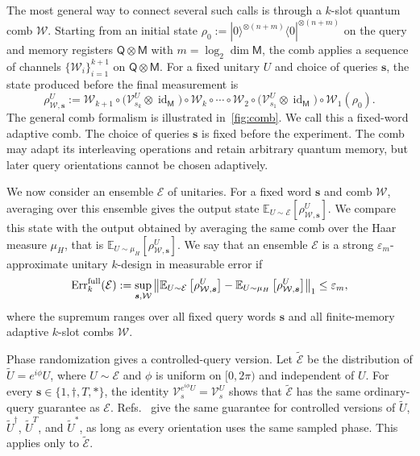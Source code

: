 \documentclass[
    aps,
    superscriptaddress,
    onecolumn,
    10pt,
    prx,
    nofootinbib
]{revtex4-2}
\newcommand{\E}{\mathbb E}
\newcommand{\cE}{\mathcal E}
\theoremstyle{namedstatement}
\theoremstyle{plain}
\begin{document}
The most general way to connect several such calls is through a $k$-slot quantum comb $\mathcal W$. Starting from an initial state $\rho_0:=|0\rangle^{\otimes (n+m)}\langle 0|^{\otimes (n+m)}$ on the query and memory registers $\mathsf{Q}\otimes \mathsf{M}$ with $m=\log_2 \operatorname{dim}\mathsf{M}$, the comb applies a sequence of channels $\{\mathcal{W}_{i}\}_{i=1}^{k+1}$ on $\mathsf{Q} \otimes \mathsf{M}$.
For a fixed unitary $U$ and choice of queries $\bm s$, the state produced before the final measurement is
\begin{equation}\label{eq:comb-output-main}
    \rho_{\mathcal W,\bm s}^{U}
    :=
    \mathcal W_{k+1}
    \circ
    \bigl(
        \mathcal V_{s_k}^{U}
        \otimes
        \operatorname{id}_{\mathsf{M}}
    \bigr)
    \circ
    \mathcal W_{k}
    \circ\cdots\circ
    \mathcal W_2
    \circ
    \bigl(
        \mathcal V_{s_1}^{U}
        \otimes
        \operatorname{id}_{\mathsf{M}}
    \bigr)
    \circ
    \mathcal W_1
    (\rho_0).
\end{equation}
The general comb formalism is illustrated in~\cref{fig:comb}. We call this a fixed-word adaptive comb. The choice of queries $\bm s$ is fixed before the experiment. The comb may adapt its interleaving operations and retain arbitrary quantum memory, but later query orientations cannot be chosen adaptively.

We now consider an  ensemble $\cE$ of unitaries. For a fixed word $\bm s$ and comb $\mathcal W$, averaging over this ensemble gives the output state $\E_{U\sim\cE}\left[\rho_{\mathcal W,\bm s}^{U}\right]$. We compare this state with the output obtained by averaging the same comb over the Haar measure $\mu_H$, that is $\E_{U\sim \mu_H}\left[\rho_{\mathcal W,\bm s}^{U}\right]$. 
We say that an ensemble $\cE$ is a strong $\varepsilon_m$-approximate unitary $k$-design in measurable error if
\begin{equation}\label{eq:measurable-error-main}
 \operatorname{Err}_{k}^{\rm full}(\mathcal{E}):=\sup_{\bm s,\mathcal W}
\left\|
\E_{U\sim\cE}
\left[\rho_{\mathcal W,\bm s}^{U}\right]
-
\E_{U\sim \mu_H}
\left[\rho_{\mathcal W,\bm s}^{U}\right]
\right\|_1
\leq
\varepsilon_m,
\end{equation}
where the supremum ranges over all fixed query words $\bm s$ and all finite-memory adaptive $k$-slot combs $\mathcal W$. 

Phase randomization gives a controlled-query version. Let $\widetilde{\cE}$ be the distribution of $\widetilde U=e^{i\phi}U$, where $U\sim\cE$ and $\phi$ is uniform on $[0,2\pi)$ and independent of $U$. For every $\bm{s}\in\{1,\dagger,T,*\}$, the identity $\mathcal V_s^{e^{i\phi}U}=\mathcal V_s^U$ shows that $\widetilde{\cE}$ has the same ordinary-query guarantee as $\cE$. Refs.~\cite{Sheridan_Maslov_Mosca_2009,tang2026controlledunitarieshelpful} give the same guarantee for controlled versions of $\widetilde U$, $\widetilde U^\dagger$, $\widetilde U^T$, and $\widetilde U^*$, as long as every orientation uses the same sampled phase. This applies only to $\widetilde{\cE}$.
\end{document}
